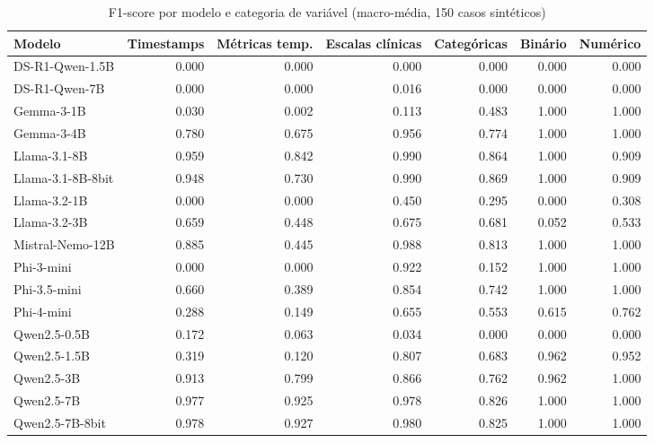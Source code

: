 \begin{table}[htbp]
\centering
\small
\begin{tabular}{lrrrrrr}
\toprule
Modelo & Timestamps & Métricas temp. & Escalas clínicas & Categóricas & Binário & Numérico \\
\midrule
DS-R1-Qwen-1.5B & 0.000 & 0.000 & 0.000 & 0.000 & 0.000 & 0.000 \\
DS-R1-Qwen-7B & 0.000 & 0.000 & 0.016 & 0.000 & 0.000 & 0.000 \\
Gemma-3-1B & 0.030 & 0.002 & 0.113 & 0.483 & 1.000 & 1.000 \\
Gemma-3-4B & 0.780 & 0.675 & 0.956 & 0.774 & 1.000 & 1.000 \\
Llama-3.1-8B & 0.959 & 0.842 & 0.990 & 0.864 & 1.000 & 0.909 \\
Llama-3.1-8B-8bit & 0.948 & 0.730 & 0.990 & 0.869 & 1.000 & 0.909 \\
Llama-3.2-1B & 0.000 & 0.000 & 0.450 & 0.295 & 0.000 & 0.308 \\
Llama-3.2-3B & 0.659 & 0.448 & 0.675 & 0.681 & 0.052 & 0.533 \\
Mistral-Nemo-12B & 0.885 & 0.445 & 0.988 & 0.813 & 1.000 & 1.000 \\
Phi-3-mini & 0.000 & 0.000 & 0.922 & 0.152 & 1.000 & 1.000 \\
Phi-3.5-mini & 0.660 & 0.389 & 0.854 & 0.742 & 1.000 & 1.000 \\
Phi-4-mini & 0.288 & 0.149 & 0.655 & 0.553 & 0.615 & 0.762 \\
Qwen2.5-0.5B & 0.172 & 0.063 & 0.034 & 0.000 & 0.000 & 0.000 \\
Qwen2.5-1.5B & 0.319 & 0.120 & 0.807 & 0.683 & 0.962 & 0.952 \\
Qwen2.5-3B & 0.913 & 0.799 & 0.866 & 0.762 & 0.962 & 1.000 \\
Qwen2.5-7B & 0.977 & 0.925 & 0.978 & 0.826 & 1.000 & 1.000 \\
Qwen2.5-7B-8bit & 0.978 & 0.927 & 0.980 & 0.825 & 1.000 & 1.000 \\
\bottomrule
\end{tabular}
\caption{F1-score por modelo e categoria de variável (macro-média, 150 casos sintéticos)}
\label{tab:resultados-f1}
\end{table}